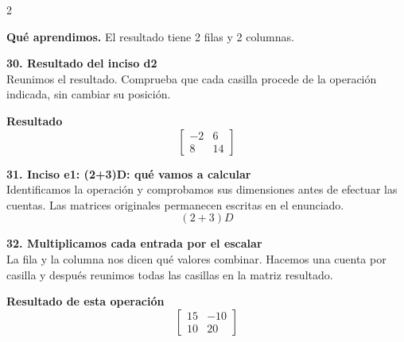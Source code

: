 \documentclass[11pt,a4paper,landscape]{article}
\begin{document}
\begin{multicols*}{2}
\begin{minipage}{\linewidth}
\par\smallskip\textbf{Qué aprendimos.} El resultado tiene 2 filas y 2 columnas.
\end{minipage}\par\medskip
\noindent\begin{minipage}{\linewidth}\textbf{30. Resultado del inciso d2}\\[2pt]Reunimos el resultado. Comprueba que cada casilla procede de la operación indicada, sin cambiar su posición.
\par\smallskip \textbf{Resultado}\[\begin{bmatrix}-2 & 6\\8 & 14\end{bmatrix}\]
\end{minipage}\par\medskip
\noindent\begin{minipage}{\linewidth}\textbf{31. Inciso e1: (2+3)D: qué vamos a calcular}\\[2pt]Identificamos la operación y comprobamos sus dimensiones antes de efectuar las cuentas. Las matrices originales permanecen escritas en el enunciado.
\[(2+3)D\]
\end{minipage}\par\medskip
\noindent\begin{minipage}{\linewidth}\textbf{32. Multiplicamos cada entrada por el escalar}\\[2pt]La fila y la columna nos dicen qué valores combinar. Hacemos una cuenta por casilla y después reunimos todas las casillas en la matriz resultado.
\par{}\par\smallskip
\par\smallskip \textbf{Resultado de esta operación}\[\begin{bmatrix}15 & -10\\10 & 20\end{bmatrix}\]

\end{minipage}
\end{multicols*}
\end{document}
